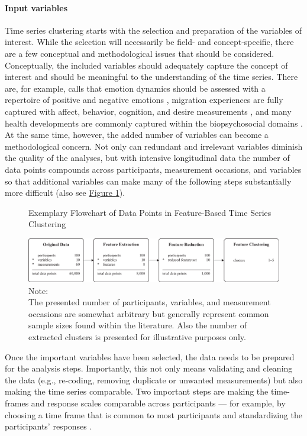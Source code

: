\documentclass[man, 12pt, a4paper, mask, floatsintext]{apa7}
\theoremstyle{break}
\theoremstyle{plain}
\newcommand{\fgrref}[2][]{\hyperref[#2]{Figure \ref*{#2}#1}}
\begin{document}
\paragraph{Input variables}
Time series clustering starts with the selection and preparation of the variables of interest. While the selection will necessarily be field- and concept-specific, there are a few conceptual and methodological issues that should be considered. Conceptually, the included variables should adequately capture the concept of interest and should be meaningful to the understanding of the time series. There are, for example, calls that emotion dynamics should be assessed with a repertoire of positive and negative emotions \citep[e.g.,][]{dejonckheere2019}, migration experiences are fully captured with affect, behavior, cognition, and desire measurements \citep[e.g.,][]{Kreienkamp2022d}, and many health developments are commonly captured within the biopsychosocial domains \citep[e.g.,][]{suls2004}. At the same time, however, the added number of variables can become a methodological concern. Not only can redundant and irrelevant variables diminish the quality of the analyses, but with intensive longitudinal data the number of data points compounds across participants, measurement occasions, and variables so that additional variables can make many of the following steps substantially more difficult (also see \fgrref{fig:TSCFlowN}). 

\begin{figure}[!ht] %
  \caption{Exemplary Flowchart of Data Points in Feature-Based Time Series Clustering}
  \label{fig:TSCFlowN}
  \centering\includegraphics[width=\textwidth]{figures/TS Cluster Flow/tsClustFlowN.pdf}
  \caption*{Note: \\
  The presented number of participants, variables, and measurement occasions are somewhat arbitrary but generally represent common sample sizes found within the literature. Also the number of extracted clusters is presented for illustrative purposes only.}
\end{figure}

Once the important variables have been selected, the data needs to be prepared for the analysis steps. Importantly, this not only means validating and cleaning the data (e.g., re-coding, removing duplicate or unwanted measurements) but also making the time series comparable. Two important steps are making the time-frames and response scales comparable across participants --- for example, by choosing a time frame that is common to most participants and standardizing the participants' responses \citep{liao2005}.
\end{document}
